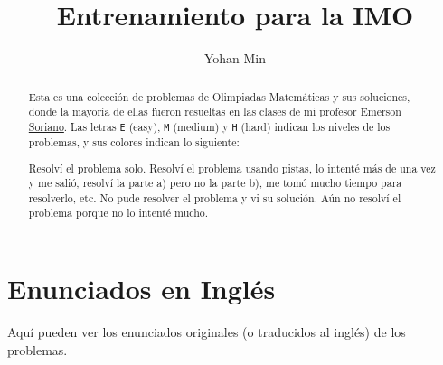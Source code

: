 \documentclass[11pt]{scrartcl}
\title{Entrenamiento para la IMO}
\author{Yohan Min}
\begin{document}
\maketitle

\begin{abstract}
	Esta es una colección de problemas de Olimpiadas Matemáticas y sus soluciones, donde la mayoría de ellas fueron resueltas en las clases de mi profesor \href{https://www.facebook.com/emerson.sorianoperez}{Emerson Soriano}. Las letras \verb|E| (easy), \verb|M| (medium) y \verb|H| (hard) indican los niveles de los problemas, y sus colores indican lo siguiente:
	\begin{description}[labelwidth=\widthof{\texttt{aaaaa}}+1.2em,leftmargin=\widthof{\texttt{aaaaa}a}+1.2em,align=right]
		 Resolví el problema solo.
		 Resolví el problema usando pistas, lo intenté más de una vez y me salió, resolví la parte a) pero no la parte b), me tomó mucho tiempo para resolverlo, etc.
		 No pude resolver el problema y vi su solución.
		 Aún no resolví el problema porque no lo intenté mucho.
	\end{description}
\end{abstract}

\tableofcontents













%
%
%

\section{Enunciados en Inglés}

Aquí pueden ver los enunciados originales (o traducidos al inglés) de los problemas.

\makehints
\clearpage
\printbibliography
\end{document}
